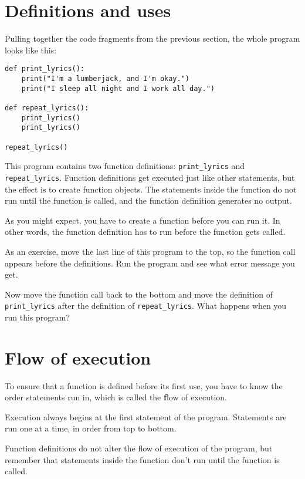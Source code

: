 \documentclass[
DIV=11,
fontsize=13,
twoside,
headinclude=false,
titlepage=firstiscover,
abstract=true,
headsepline=true,
footsepline=true,
chapterprefix=true, %
headings=big,
bibliography=totoc,%
captions=tableheading
]{scrbook}
\theoremstyle{definition}
\begin{document}
\section{Definitions and uses}

Pulling together the code fragments from the previous section, the
whole program looks like this:

\begin{lstlisting}
def print_lyrics():
    print("I'm a lumberjack, and I'm okay.")
    print("I sleep all night and I work all day.")

def repeat_lyrics():
    print_lyrics()
    print_lyrics()

repeat_lyrics()
\end{lstlisting}
%
This program contains two function definitions: \verb"print_lyrics" and
\verb"repeat_lyrics".  Function definitions get executed just like other
statements, but the effect is to create function objects.  The statements
inside the function do not run until the function is called, and
the function definition generates no output.

As you might expect, you have to create a function before you can
run it.  In other words, the function definition has to run
before the function gets called.

As an exercise, move the last line of this program
to the top, so the function call appears before the definitions. Run 
the program and see what error
message you get.

Now move the function call back to the bottom
and move the definition of \verb"print_lyrics" after the definition of
\verb"repeat_lyrics".  What happens when you run this program?


\section{Flow of execution}

To ensure that a function is defined before its first use,
you have to know the order statements run in, which is
called the {\textbf flow of execution}.

Execution always begins at the first statement of the program.
Statements are run one at a time, in order from top to bottom.

Function definitions do not alter the flow of execution of the
program, but remember that statements inside the function don't
run until the function is called.
\end{document}
